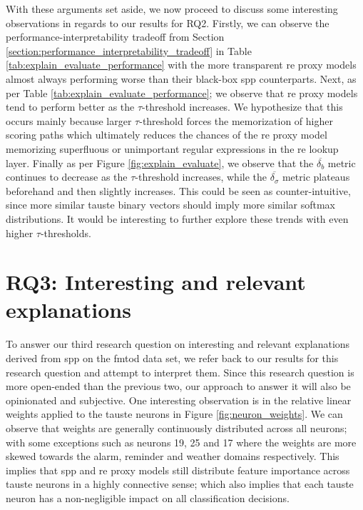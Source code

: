 With these arguments set aside, we now proceed to discuss some interesting
observations in regards to our results for RQ2. Firstly, we can observe the
performance-interpretability tradeoff from Section
\ref{section:performance_interpretability_tradeoff} in Table
\ref{tab:explain_evaluate_performance} with the more transparent \ac{re} proxy
models almost always performing worse than their black-box \ac{spp}
counterparts. Next, as per Table \ref{tab:explain_evaluate_performance}; we
observe that \ac{re} proxy models tend to perform better as the $\tau$-threshold
increases. We hypothesize that this occurs mainly because larger
$\tau$-threshold forces the memorization of higher scoring paths which
ultimately reduces the chances of the \ac{re} proxy model memorizing superfluous
or unimportant regular expressions in the \ac{re} lookup layer. Finally as per
Figure \ref{fig:explain_evaluate}, we observe that the $\overline{\delta_{b}}$
metric continues to decrease as the $\tau$-threshold increases, while the
$\overline{\delta_{\sigma}}$ metric plateaus beforehand and then slightly
increases. This could be seen as counter-intuitive, since more similar
\ac{tauste} binary vectors should imply more similar softmax distributions. It
would be interesting to further explore these trends with even higher
$\tau$-thresholds.

\section{RQ3: Interesting and relevant explanations}

\label{section:discussion_regex}

To answer our third research question on interesting and relevant explanations
derived from \ac{spp} on the \ac{fmtod} data set, we refer back to our results for this
research question and attempt to interpret them. Since this research question is
more open-ended than the previous two, our approach to answer it will also be
opinionated and subjective. One interesting observation is in the relative
linear weights applied to the \ac{tauste} neurons in Figure \ref{fig:neuron_weights}.
We can observe that weights are generally continuously distributed across all
neurons; with some exceptions such as neurons 19, 25 and 17 where the weights
are more skewed towards the alarm, reminder and weather domains respectively.
This implies that \ac{spp} and \ac{re} proxy models still distribute feature
importance across \ac{tauste} neurons in a highly connective sense; which also implies that
each \ac{tauste} neuron has a non-negligible impact on all classification decisions.

